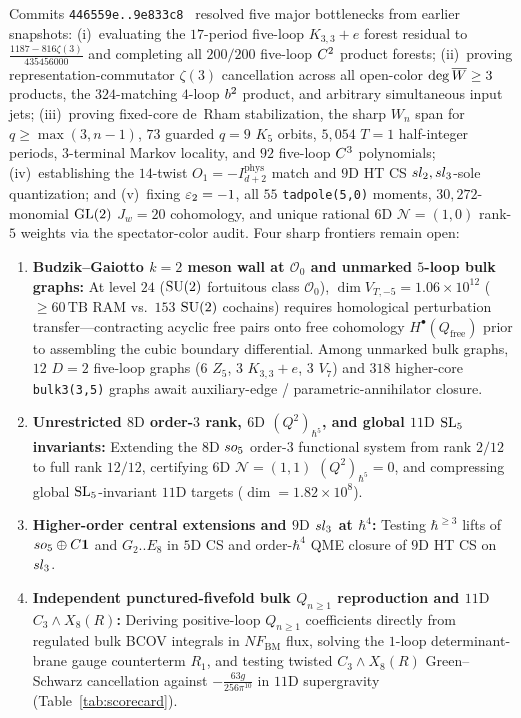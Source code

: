 Commits \texttt{446559e..9e833c8}~\cite{Repo9e833c8} resolved five major bottlenecks from earlier snapshots: (i)~evaluating the $17$-period five-loop $K_{3,3}+e$ forest residual to $\frac{1187-816\zeta(3)}{435456000}$ and completing all $200/200$ five-loop $C^2$ product forests; (ii)~proving representation-commutator $\zeta(3)$ cancellation across all open-color $\deg\overline{W} \ge 3$ products, the $324$-matching $4$-loop $b^2$ product, and arbitrary simultaneous input jets; (iii)~proving fixed-core de~Rham stabilization, the sharp $W_n$ span for $q \ge \max(3,n-1)$, $73$ guarded $q=9$ $K_5$ orbits, $5{,}054$ $T=1$ half-integer periods, $3$-terminal Markov locality, and $92$ five-loop $C^3$ polynomials; (iv)~establishing the $14$-twist $O_1 = -I^{\mathrm{phys}}_{d+2}$ match and $9\mathrm{D}$ HT CS $sl_2,sl_3$-sole quantization; and (v)~fixing $\varepsilon_2 = -1$, all $55$ \texttt{tadpole(5,0)} moments, $30{,}272$-monomial $\operatorname{GL}(2)$ $J_w=20$ cohomology, and unique rational $6\mathrm{D}$ $\mathcal{N}=(1,0)$ rank-$5$ weights via the spectator-color audit. Four sharp frontiers remain open:
\begin{enumerate}[label=(\arabic*),leftmargin=*]
  \item \textbf{Budzik--Gaiotto $k=2$ meson wall at $\mathcal{O}_0$ and unmarked $5$-loop bulk graphs:} At level $24$ ($\operatorname{SU}(2)$ fortuitous class $\mathcal{O}_0$), $\dim V_{T,-5} = 1.06\times 10^{12}$ ($\ge 60\,\mathrm{TB}$ RAM vs.\ $153$ $\operatorname{SU}(2)$ cochains) requires homological perturbation transfer---contracting acyclic free pairs onto free cohomology $H^\bullet(Q_{\mathrm{free}})$ prior to assembling the cubic boundary differential. Among unmarked bulk graphs, $12$ $D=2$ five-loop graphs ($6$ $Z_5$, $3$ $K_{3,3}+e$, $3$ $V_7$) and $318$ higher-core \texttt{bulk3(3,5)} graphs await auxiliary-edge / parametric-annihilator closure.

  \item \textbf{Unrestricted $8\mathrm{D}$ order-$3$ rank, $6\mathrm{D}$ $(Q^2)_{\hbar^5}$, and global $11\mathrm{D}$ $\operatorname{SL}_5$ invariants:} Extending the $8\mathrm{D}$ $so_5$ order-$3$ functional system from rank $2/12$ to full rank $12/12$, certifying $6\mathrm{D}$ $\mathcal{N}=(1,1)$ $(Q^2)_{\hbar^5}=0$, and compressing global $\operatorname{SL}_5$-invariant $11\mathrm{D}$ targets ($\dim = 1.82\times 10^8$).

  \item \textbf{Higher-order central extensions and $9\mathrm{D}$ $sl_3$ at $\hbar^4$:} Testing $\hbar^{\ge 3}$ lifts of $so_5\oplus C\mathbf{1}$ and $G_2..E_8$ in $5\mathrm{D}$ CS and order-$\hbar^4$ QME closure of $9\mathrm{D}$ HT CS on $sl_3$.

  \item \textbf{Independent punctured-fivefold bulk $Q_{n\ge 1}$ reproduction and $11\mathrm{D}$ $C_3\wedge X_8(R)$:} Deriving positive-loop $Q_{n\ge 1}$ coefficients directly from regulated bulk BCOV integrals in $N F_{\mathrm{BM}}$ flux, solving the $1$-loop determinant-brane gauge counterterm $R_1$, and testing twisted $C_3\wedge X_8(R)$ Green--Schwarz cancellation against $-\frac{63g}{256\pi^{10}}$ in $11\mathrm{D}$ supergravity (Table~\ref{tab:scorecard}).
\end{enumerate}

